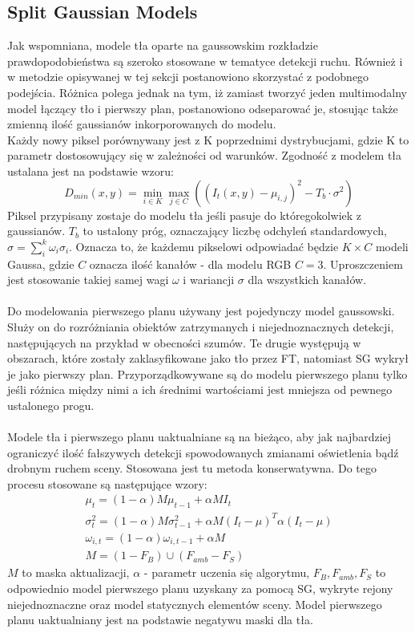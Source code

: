\subsection{Split Gaussian Models}
\label{sec:SG}
Jak wspomniana, modele tła oparte na gaussowskim rozkładzie prawdopodobieństwa są szeroko stosowane w tematyce detekcji ruchu. Również i w metodzie opisywanej w tej sekcji postanowiono skorzystać z podobnego podejścia. Różnica polega jednak na tym, iż zamiast tworzyć jeden multimodalny model łączący tło i pierwszy plan, postanowiono odseparować je, stosując także zmienną ilość gaussianów inkorporowanych do modelu.\\
Każdy nowy piksel porównywany jest z K poprzednimi dystrybucjami, gdzie K to parametr dostosowujący się w zależności od warunków. Zgodność z modelem tła ustalana jest na podstawie wzoru:
\begin{equation}
D_{min}(x,y) = \min_{i\in K}\max_{j\in C}((I_{t}(x,y)-\mu_{i,j})^2-T_{b}\cdot\sigma^2)
\end{equation}
Piksel przypisany zostaje do modelu tła jeśli pasuje do któregokolwiek z gaussianów. $T_{b}$ to ustalony próg, oznaczający liczbę odchyleń standardowych, $\sigma = \sum_{i}^{k}\omega_{i}\sigma_{i}$. Oznacza to, że każdemu pikselowi odpowiadać będzie $K\times C$ modeli Gaussa, gdzie $C$ oznacza ilość kanałów - dla modelu RGB $C = 3$. Uproszczeniem jest stosowanie takiej samej wagi $\omega$ i wariancji $\sigma$ dla wszystkich kanałów.
\paragraph{}
Do modelowania pierwszego planu używany jest pojedynczy model gaussowski. Służy on do rozróżniania obiektów zatrzymanych i niejednoznacznych detekcji, następujących na przykład w obecności szumów. Te drugie występują w obszarach, które zostały zaklasyfikowane jako tło przez FT, natomiast SG wykrył je jako pierwszy plan. Przyporządkowywane są do modelu pierwszego planu tylko jeśli różnica między nimi a ich średnimi wartościami jest mniejsza od pewnego ustalonego progu.
\paragraph{}
Modele tła i pierwszego planu uaktualniane są na bieżąco, aby jak najbardziej ograniczyć ilość fałszywych detekcji spowodowanych zmianami oświetlenia bądź drobnym ruchem sceny. Stosowana jest tu metoda konserwatywna. Do tego procesu stosowane są następujące wzory:
\begin{gather}
\mu_{t} = (1-\alpha)M\mu_{t-1}+\alpha MI_{t} \\
\sigma_{t}^2 = (1-\alpha)M\sigma_{t-1}^2+\alpha M(I_{t}-\mu)^{T}\alpha(I_{t}-\mu) \\
\omega_{i,t} = (1-\alpha)\omega_{i,t-1}+\alpha M \\
M = (1-F_{B})\cup(F_{amb}-F_{S})
\end{gather}
$M$ to maska aktualizacji, $\alpha$ - parametr uczenia się algorytmu, $F_{B}, F_{amb}, F_{S}$ to odpowiednio model pierwszego planu uzyskany za pomocą SG, wykryte rejony niejednoznaczne oraz model statycznych elementów sceny. Model pierwszego planu uaktualniany jest na podstawie negatywu maski dla tła.
